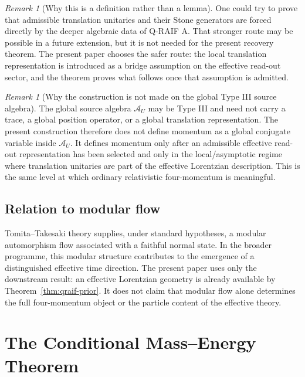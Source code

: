 \documentclass[12pt,a4paper]{article}
\theoremstyle{definition}
\theoremstyle{remark}
\newtheorem{remark}[theorem]{Remark}
\newcommand{\AU}{\mathcal{A}_U}
\begin{document}
\begin{remark}[Why this is a definition rather than a lemma]
One could try to prove that admissible translation unitaries and their Stone generators are forced directly by the deeper algebraic data of Q-RAIF A. That stronger route may be possible in a future extension, but it is not needed for the present recovery theorem. The present paper chooses the safer route: the local translation representation is introduced as a bridge assumption on the effective read-out sector, and the theorem proves what follows once that assumption is admitted.
\end{remark}

\begin{remark}[Why the construction is not made on the global Type III source algebra]
\label{rem:typeIII}
The global source algebra $\AU$ may be Type III and need not carry a trace, a global position operator, or a global translation representation. The present construction therefore does not define momentum as a global conjugate variable inside $\AU$. It defines momentum only after an admissible effective read-out representation has been selected and only in the local/asymptotic regime where translation unitaries are part of the effective Lorentzian description. This is the same level at which ordinary relativistic four-momentum is meaningful.
\end{remark}

\subsection{Relation to modular flow}

Tomita--Takesaki theory supplies, under standard hypotheses, a modular automorphism flow associated with a faithful normal state. In the broader programme, this modular structure contributes to the emergence of a distinguished effective time direction. The present paper uses only the downstream result: an effective Lorentzian geometry is already available by Theorem~\ref{thm:qraif-prior}. It does not claim that modular flow alone determines the full four-momentum object or the particle content of the effective theory.

\section{The Conditional Mass--Energy Theorem}
\label{sec:theorem}
\end{document}
